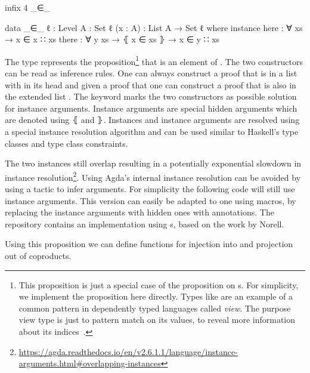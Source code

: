 \begin{code}[hide]
infix 4 _∈_
\end{code}
\begin{code}
data _∈_ {ℓ : Level} {A : Set ℓ} (x : A) : List A → Set ℓ where
  instance
    here   : ∀ {xs} → x ∈ x ∷ xs
    there  : ∀ {y xs} → ⦃ x ∈ xs ⦄ → x ∈ y ∷ xs
\end{code}
The type
\AgdaSpace{}\AgdaSpace{}
represents the proposition\footnote{This proposition is just a special case of
  the  proposition on s.
  For simplicity, we implement the proposition here directly.
  Types like  are an example of a common pattern in
  dependently typed languages called \textit{view}.
  The purpose view type is just to pattern match on its values, to reveal more
  information about its indices~\cite{DBLP:conf/afp/Norell08}.}
that  is an element of .
The two constructors can be read as inference rules.
One can always construct a proof that  is in a list with
 in its head and given a proof that
\AgdaSpace{}\AgdaSpace{}
one can construct a proof that  is also in the extended list
\AgdaSpace{}\AgdaSpace{}.
The  keyword marks the two constructors as possible
solution for instance arguments.
Instance arguments are special hidden arguments which are denoted using
$\lBrace$ and $\rBrace$.
Instances and instance arguments are resolved using a special instance
resolution algorithm and can be used similar to Haskell's type classes
and type class constraints.

The two instances still overlap resulting in a potentially exponential slowdown
in instance resolution\footnote{\url{https://agda.readthedocs.io/en/v2.6.1.1/language/instance-arguments.html\#overlapping-instances}}.
Using Agda's internal instance resolution can be avoided by using a
tactic to infer  arguments.
For simplicity the following code will still use instance arguments.
This version can easily be adapted to one using macros, by replacing the
instance arguments with hidden ones with  annotations.
The repository contains an implementation using s, based on
the work by Norell.

Using this proposition we can define functions for injection into and projection
out of coproducts.

